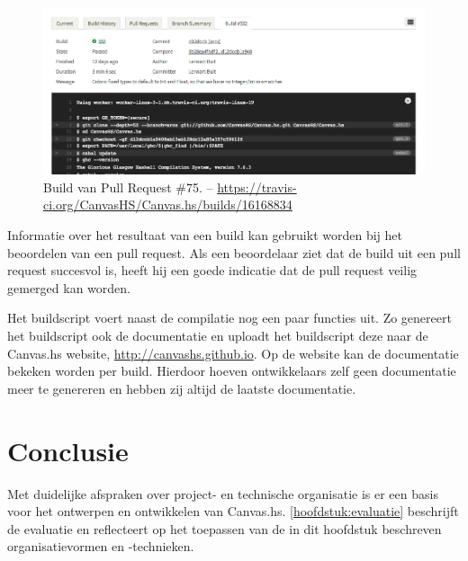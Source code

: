 \begin{figure}[H]
\begin{center}
\includegraphics[keepaspectratio,width=\textwidth]{./images/travis.png}
\caption{Build van Pull Request \#75. – \url{https://travis-ci.org/CanvasHS/Canvas.hs/builds/16168834}}
\label{fig:travis}
\end{center}
\end{figure}

Informatie over het resultaat van een build kan gebruikt worden bij het beoordelen van een pull request. Als een beoordelaar ziet dat de build uit een pull request succesvol is, heeft hij een goede indicatie dat de pull request veilig gemerged kan worden.

Het buildscript voert naast de compilatie nog een paar functies uit. Zo genereert het buildscript ook de documentatie en uploadt het buildscript deze naar de Canvas.hs website, \url{http://canvashs.github.io}. Op de website kan de documentatie bekeken worden per build. Hierdoor hoeven ontwikkelaars zelf geen documentatie meer te genereren en hebben zij altijd de laatste documentatie.

\section{Conclusie}
Met duidelijke afspraken over project- en technische organisatie is er een basis voor het ontwerpen en ontwikkelen van Canvas.hs. \autoref{hoofdstuk:evaluatie} beschrijft de evaluatie en reflecteert op het toepassen van de in dit hoofdstuk beschreven organisatievormen en -technieken. 
